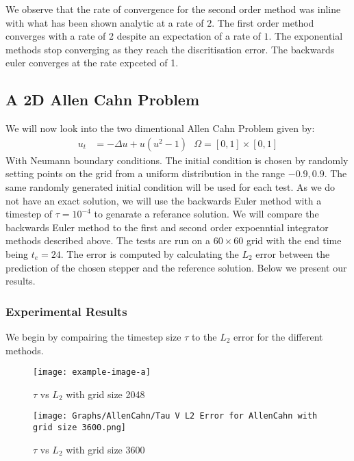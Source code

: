 We observe that the rate of convergence for the second order method was inline with what has been shown analytic\cite{Huang2022} at a rate of $2$.
The first order method converges with a rate of 2 despite an expectation of a rate of $1$\cite{Huang2022}.
The exponential methods stop converging as they reach the discritisation error.
The backwards euler converges at the rate expceted of 1.

\subsection{A 2D Allen Cahn Problem}

We will now look into the two dimentional Allen Cahn Problem given by:
\begin{align*}
    u_t &= -\Delta u + u (u^2-1) \text{ } \Omega=[0,1]\times[0,1]
\end{align*}
With Neumann boundary conditions.
The initial condition is chosen by randomly setting points on the grid from a uniform distribution in the range $-0.9,0.9$.
The same randomly generated initial condition will be used for each test.
As we do not have an exact solution, we will use the backwards Euler method with a timestep of $\tau = 10^{-4}$ to genarate a referance solution.
We will compare the backwards Euler method to the first and second order expoenntial integrator methods described above.
The tests are run on a $60\times60$ grid with the end time being $t_e=24$.
The error is computed by calculating the $L_2$ error between the prediction of the chosen stepper and the reference solution. 
Below we present our results.

\subsubsection{Experimental Results}

We begin by compairing the timestep size $\tau$ to the $L_2$ error for the different methods.

\begin{figure}[H]
    \centering
    \begin{minipage}{0.49\textwidth}
        \texttt{[image: example-image-a]} %
        \caption{$\tau$ vs $L_2$ with grid size 2048}
        \label{fig:ACtauE}
    \end{minipage}\hfill
    \centering
    \begin{minipage}{0.49\textwidth}
        \texttt{[image: Graphs/AllenCahn/Tau V L2 Error for AllenCahn with grid size 3600.png]} %
        \caption{$\tau$ vs $L_2$ with grid size 3600}
        \label{fig:ACtauE1024}
    \end{minipage}\hfill
\end{figure}

